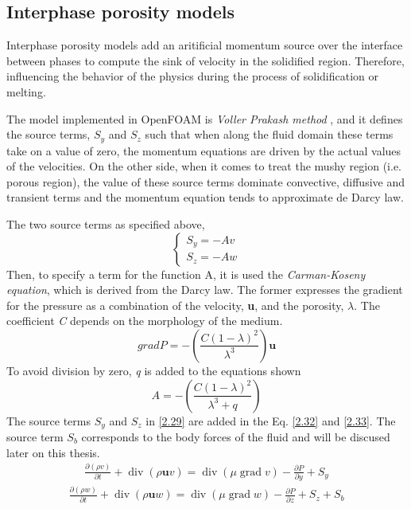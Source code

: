 \subsection{Interphase porosity models}

\setlength{\parindent}{0.5cm} Interphase porosity models add an aritificial momentum source over the interface between phases to compute the sink of velocity in the solidified region. Therefore, influencing the behavior of the physics during the process of solidification or melting.

\noindent The model implemented in OpenFOAM is \textit{Voller Prakash method} \cite{voller_prakash_1987}, and it defines the source terms, \textit{$S_y$} and \textit{$S_z$} such that when along the fluid domain these terms take on a value of zero, the momentum equations are driven by the actual values of the velocities. On the other side, when it comes to treat the mushy region (i.e. porous region), the value of these source terms dominate convective, diffusive and transient terms and the momentum equation tends to approximate de Darcy law.

\noindent The two source terms as specified above,
\begin{equation}
	\left\{\begin{array}{l}
	S_{y}=-A v \\
	S_{z}=-A w
	\end{array}\right.
	\label{2.29}
\end{equation}
Then, to specify a term for the function A, it is used the \textit{Carman-Koseny equation}, which is derived from the Darcy law. The former expresses the gradient for the pressure as a combination of the velocity, \textbf{u}, and the porosity, $\lambda$. The coefficient \textit{C} depends on the morphology of the medium.
\begin{equation}
	gradP=-\left(\frac{C(1-\lambda)^{2}}{\lambda^{3}}\right) \mathbf{u}
	\label{2.30}
\end{equation}
To avoid division by zero, \textit{q} is added to the equations shown 
\begin{equation}
	A=-\left(\frac{C(1-\lambda)^{2}}{\lambda^{3}+q}\right)
	\label{2.31}
\end{equation}
The source terms $S_{y}$ and $S_{z}$ in \ref{2.29} are added in the Eq. \ref{2.32} and \ref{2.33}. The source term $S_{b}$ corresponds to the body forces of the fluid and will be discused later on this thesis.
\begin{equation}
	\begin{aligned}
		\frac{\partial(\rho v)}{\partial t}+\operatorname{div}(\rho \mathbf{u} v)=\operatorname{div}(\mu \operatorname{grad} v)-\frac{\partial P}{\partial y}+S_{y} 
	\end{aligned}
	\label{2.32}
\end{equation}
\begin{equation}
	\begin{aligned}
		\frac{\partial(\rho w)}{\partial t}+\operatorname{div}(\rho \mathbf{u} w)=\operatorname{div}(\mu \operatorname{grad} w)-\frac{\partial P}{\partial z}+S_{z}+S_{b}
	\end{aligned}
	\label{2.33}
\end{equation}


